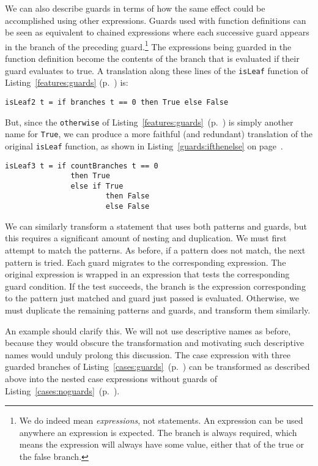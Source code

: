 We can also describe guards in terms of how the same effect could be accomplished using other expressions. Guards used with function definitions can be seen as equivalent to chained  expressions where each successive guard appears in the  branch of the preceding guard.\footnote{We do indeed mean  \emph{expressions}, not  statements. An  expression can be used anywhere an expression is expected. The  branch is always required, which means the expression will always have some value, either that of the true or the false branch.} The expressions being guarded in the function definition become the contents of the  branch that is evaluated if their guard evaluates to true. A translation along these lines of the \lstinline{isLeaf} function of Listing~\ref{features:guards} (p.~\pageref{features:guards}) is:
\begin{lstlisting}
isLeaf2 t = if branches t == 0 then True else False
\end{lstlisting}
But, since the \lstinline{otherwise} of Listing~\ref{features:guards}~(p.~\pageref{features:guards}) is simply another name for \lstinline{True}, we can produce a more faithful (and redundant) translation of the original \lstinline{isLeaf} function, as shown in Listing~\ref{guards:ifthenelse} on page~\pageref{guards:ifthenelse}.

\begin{lstlisting}[float,caption={Guards as chained if-then-else--expressions},label={guards:ifthenelse}]
isLeaf3 t = if countBranches t == 0
               then True
               else if True 
                       then False  
                       else False
\end{lstlisting}

We can similarly transform a  statement that uses both patterns and guards, but this requires a significant amount of nesting and duplication. We must first attempt to match the patterns. As before, if a pattern does not match, the next pattern is tried. Each guard migrates to the corresponding expression. The original expression is wrapped in an  expression that tests the corresponding guard condition. If the test succeeds, the  branch is the expression corresponding to the pattern just matched and guard just passed is evaluated. Otherwise, we must duplicate the remaining patterns and guards, and transform them similarly.

An example should clarify this. We will not use descriptive names as before, because they would obscure the transformation and motivating such descriptive names would unduly prolong this discussion. The case expression with three guarded branches of Listing~\ref{cases:guards}~(p.~\pageref{cases:guards}) can be transformed as described above into the nested case expressions without guards of Listing~\ref{cases:noguards}~(p.~\pageref{cases:noguards}).

